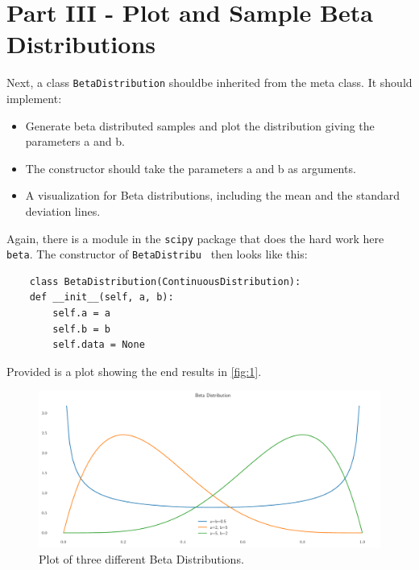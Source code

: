 \documentclass{CPSReport}
\begin{document}
\section{Part III - Plot and Sample Beta Distributions}
Next, a class \texttt{BetaDistribution} shouldbe inherited from the meta class. It should implement:

\begin{itemize}
    \item Generate beta distributed samples and plot the distribution giving the parameters a and b.
    \item The constructor should take the parameters a and b as arguments.
    \item A visualization for Beta distributions, including the mean and the standard deviation lines.
\end{itemize}

Again, there is a module in the \texttt{scipy} package that does the hard work here \texttt{beta}.
The constructor of \texttt{BetaDistribu
} then looks like this:

\begin{verbatim}
    class BetaDistribution(ContinuousDistribution):
    def __init__(self, a, b):
        self.a = a
        self.b = b
        self.data = None
\end{verbatim}

Provided is a plot showing the end results in \autoref{fig:1}.

\begin{figure}[ht]
    \begin{center}
        \includegraphics[width=1\linewidth]{../beta.pdf}
    \end{center}
    \caption{Plot of three different Beta Distributions.}
    \label{fig:1}
\end{figure}

\clearpage
\end{document}
